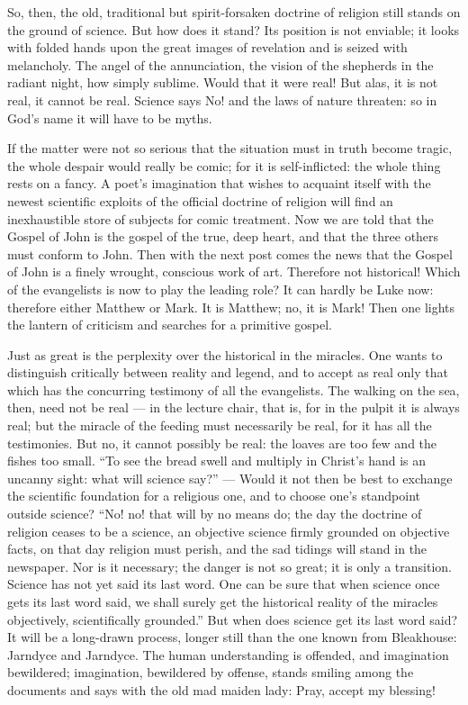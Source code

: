 \documentclass[12pt,a4paper,openany]{book}
\newcommand{\opage}[1]{\marginnote{\footnotesize\textit{[#1]}}}
\begin{document}
So, then, the old, traditional but spirit-forsaken doctrine of religion still stands on the ground of science. But how does it stand? Its position is not enviable; it looks with folded hands upon the great images of revelation and is seized with melancholy. The angel of the annunciation, the vision of the shepherds in the radiant night, how simply sublime. Would that it were real! But alas, it is not real, it cannot be real. Science says No! and the laws of nature threaten: so in God's name it will have to be myths.

If the matter were not so serious that the situation must in truth become tragic, the whole despair would really be comic; for it is self-inflicted: the whole thing rests on a fancy. A poet's imagination that wishes to acquaint itself with the newest scientific exploits of the official doctrine of religion will find an inexhaustible store of subjects for comic treatment. Now we are told that the Gospel of John is the gospel of the true, deep heart, and that the three others must conform to John. Then with the next post comes the news that the Gospel of John is a finely wrought, conscious work of art. Therefore not historical! Which of the evangelists is now to play the leading role? It can hardly be Luke now: therefore either Matthew or Mark. It is Matthew; no, it is Mark! Then one lights the lantern of criticism and searches for a primitive gospel.

Just as great is the perplexity over the historical in the miracles. One wants to distinguish critically between reality and legend, and to accept as real only that
\setcounter{footnote}{0}%
\opage{38}which has the concurring testimony of all the evangelists. The walking on the sea, then, need not be real --- in the lecture chair, that is, for in the pulpit it is always real; but the miracle of the feeding must necessarily be real, for it has all the testimonies. But no, it cannot possibly be real: the loaves are too few and the fishes too small. ``To see the bread swell and multiply in Christ's hand is an uncanny sight: what will science say?'' --- Would it not then be best to exchange the scientific foundation for a religious one, and to choose one's standpoint outside science? ``No! no! that will by no means do; the day the doctrine of religion ceases to be a science, an objective science firmly grounded on objective facts, on that day religion must perish, and the sad tidings will stand in the newspaper. Nor is it necessary; the danger is not so great; it is only a transition. Science has not yet said its last word. One can be sure that when science once gets its last word said, we shall surely get the historical reality of the miracles objectively, scientifically grounded.'' But when does science get its last word said? It will be a long-drawn process, longer still than the one known from Bleakhouse: Jarndyce and Jarndyce. The human understanding is offended, and imagination bewildered; imagination, bewildered by offense, stands smiling among the documents and says with the old mad maiden lady: Pray, accept my blessing!
\end{document}
